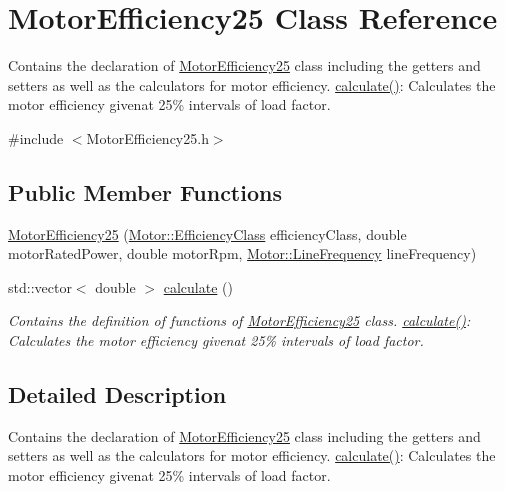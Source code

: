 \hypertarget{class_motor_efficiency25}{}\section{Motor\+Efficiency25 Class Reference}
\label{class_motor_efficiency25}


Contains the declaration of \hyperlink{class_motor_efficiency25}{Motor\+Efficiency25} class including the getters and setters as well as the calculators for motor efficiency. \hyperlink{class_motor_efficiency25_a2421a96d011677172f43d9929b250188}{calculate()}\+: Calculates the motor efficiency givenat 25\% intervals of load factor.  




{\ttfamily \#include $<$Motor\+Efficiency25.\+h$>$}

\subsection*{Public Member Functions}
\begin{DoxyCompactItemize}
\item 
\hyperlink{class_motor_efficiency25_a8e03995de84c89195fdbb250958321bc}{Motor\+Efficiency25} (\hyperlink{class_motor_afa022971ae062406a9f588c601673d4e}{Motor\+::\+Efficiency\+Class} efficiency\+Class, double motor\+Rated\+Power, double motor\+Rpm, \hyperlink{class_motor_acee1bdf1b684ad36cb80dc2829d9fcee}{Motor\+::\+Line\+Frequency} line\+Frequency)
\item 
std\+::vector$<$ double $>$ \hyperlink{class_motor_efficiency25_a2421a96d011677172f43d9929b250188}{calculate} ()
\begin{DoxyCompactList}\small\item\em Contains the definition of functions of \hyperlink{class_motor_efficiency25}{Motor\+Efficiency25} class. \hyperlink{class_motor_efficiency25_a2421a96d011677172f43d9929b250188}{calculate()}\+: Calculates the motor efficiency givenat 25\% intervals of load factor. \end{DoxyCompactList}\end{DoxyCompactItemize}


\subsection{Detailed Description}
Contains the declaration of \hyperlink{class_motor_efficiency25}{Motor\+Efficiency25} class including the getters and setters as well as the calculators for motor efficiency. \hyperlink{class_motor_efficiency25_a2421a96d011677172f43d9929b250188}{calculate()}\+: Calculates the motor efficiency givenat 25\% intervals of load factor. 

